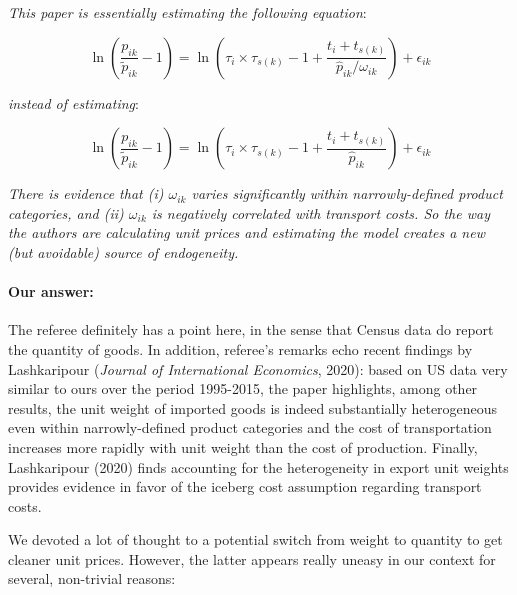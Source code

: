 \documentclass[a4paper,12pt]{article}
\begin{document}
\textit{This paper is essentially estimating the following equation}:

\begin{equation*}
\ln\left(\frac{p_{ik}}{\widetilde{p}_{ik}}-1 \right)= \ln \left(\tau_{i} \times \tau_{s(k)} -1 +\frac{t_{i} + t_{s(k)}}{\widehat{p}_{ik}/\omega_{ik}} \right) + \epsilon_{ik}
\end{equation*}

\textit{instead of estimating}:


\begin{equation*}
\ln\left(\frac{p_{ik}}{\widetilde{p}_{ik}}-1 \right)= \ln \left(\tau_{i} \times \tau_{s(k)}-1 +\frac{t_{i} + t_{s(k)}}{\widehat{p}_{ik}} \right) + \epsilon_{ik}
\end{equation*}

\textit{There is evidence that (i) $\omega_{ik}$ varies significantly within narrowly-defined product
categories, and (ii) $\omega_{ik}$ is negatively correlated with transport costs. So the
way the authors are calculating unit prices and estimating the model creates a
new (but avoidable) source of endogeneity.}

\paragraph{Our answer:}
\noindent The referee definitely has a point here, in the sense that Census data do report the quantity of goods. In addition, referee's remarks echo recent findings by Lashkaripour (\emph{Journal of International Economics}, 2020): based on US data very similar to ours over the period 1995-2015, the paper highlights, among other results, the unit weight of imported goods is indeed substantially heterogeneous even within narrowly-defined product categories and the cost of transportation increases more rapidly with unit weight than the cost of production. Finally, Lashkaripour (2020) finds accounting for the heterogeneity in export unit weights provides evidence in favor of the iceberg cost assumption regarding transport costs.

We devoted a lot of thought to a potential switch from weight to quantity to get cleaner unit prices. However, the latter appears really uneasy in our context for several, non-trivial reasons:
\end{document}
